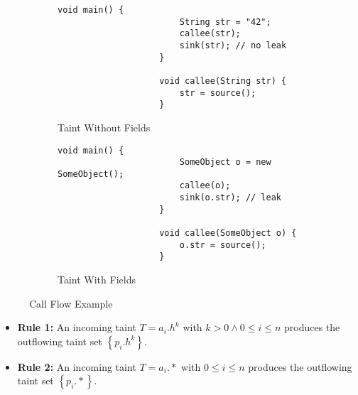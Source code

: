 \documentclass[../draft.tex]{subfiles}
\begin{document}
    \begin{figure}[t]
        \centering
        \begin{subfigure}[b]{0.45\textwidth}
            \centering
            \begin{adjustbox}{max width=\columnwidth}
                \begin{lstlisting}[gobble=20]
                    void main() {
                        String str = "42";
                        callee(str);
                        sink(str); // no leak
                    }
            
                    void callee(String str) {
                        str = source();
                    }
                \end{lstlisting}
            \end{adjustbox}
            \caption{Taint Without Fields}
        \end{subfigure}
        \qquad
        \begin{subfigure}[b]{0.45\textwidth}
            \centering
            \begin{adjustbox}{max width=\columnwidth}
                \begin{lstlisting}[gobble=20]
                    void main() {
                        SomeObject o = new SomeObject();
                        callee(o);
                        sink(o.str); // leak
                    }
            
                    void callee(SomeObject o) {
                        o.str = source();
                    }
                \end{lstlisting}
            \end{adjustbox}
            \caption{Taint With Fields}
        \end{subfigure}
        \caption{Call Flow Example}
        \label{lst:primret} 
    \end{figure}

    \begin{itemize}
        \item[] \textbf{Rule 1:} An incoming taint $T=a_i.h^k$ with $k > 0 \land 0 \leq i \leq n$ produces the outflowing taint set $\left\{p_i.h^k\right\}$.
        \item[] \textbf{Rule 2:} An incoming taint $T=a_i.*$ with $0 \leq i \leq n$ produces the outflowing taint set $\left\{p_i.*\right\}$.
    \end{itemize}
\end{document}
